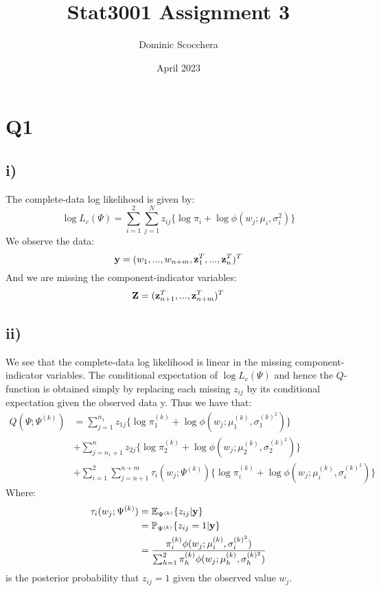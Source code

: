 \documentclass{article}
\title{Stat3001 Assignment 3}
\author{Dominic Scocchera}
\date{April 2023}
\begin{document}
\maketitle
\section*{Q1}
\subsection*{i)}
The complete-data log likelihood is given by:
$$\log L_c(\Psi)=\sum_{i=1}^{2}\sum_{j=1}^{N}z_{ij}\{\log\pi_i+\log\phi(w_j;\mu_i,\sigma_i^2)\}$$
We observe the data:
$$\bold{y}=(w_1,...,w_{n+m},\bold{z}_1^T,...,\bold{z}_n^T)^T$$
And we are missing the component-indicator variables:
$$\bold{Z}=(\bold{z}_{n+1}^T,...,\bold{z}_{n+m}^T)^T$$
\subsection*{ii)}
We see that the complete-data log likelihood is linear in the missing component-indicator variables. The conditional expectation of $\log L_c(\Psi)$ and hence the $Q$-function is obtained simply by replacing
each missing $z_{ij}$ by its conditional expectation given the observed data y. Thus we have that:
\begin{align*}
Q(\Psi;\Psi^{(k)})&=\sum_{j=1}^{n_1}z_{1j}\{\log\pi_1^{(k)}+\log\phi(w_j;\mu_1^{(k)},\sigma_1^{(k)^2})\}\\
&+\sum_{j=n_1+1}^{n}z_{2j}\{\log\pi_2^{(k)}+\log\phi(w_j;\mu_2^{(k)},\sigma_2^{(k)^2})\}\\
&+\sum_{i=1}^{2}\sum_{j=n+1}^{n+m}\tau_i(w_j;\Psi^{(k)})\{\log\pi_i^{(k)}+\log\phi(w_j;\mu_i^{(k)},\sigma_i^{(k)^2})\}
\end{align*}
Where:
\begin{align*}
\tau_{i}(w_j;\Psi^{(k)})&=\mathbb{E}_{\Psi^{(k)}}\{z_{ij}|\bold{y}\}\\
&=\mathbb{P}_{\Psi^{(k)}}\{z_{ij}=1|\bold{y}\}\\
&=\frac{\pi_i^{(k)}\phi(w_j;\mu_i^{(k)},\sigma_i^{(k)^2})}{\sum_{h=1}^2\pi_h^{(k)}\phi(w_j;\mu_h^{(k)},\sigma_h^{(k)^2})}\\
\end{align*}
is the posterior probability that $z_{ij} = 1$ given the observed value $w_j$.
\end{document}
